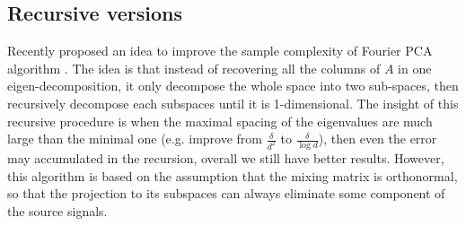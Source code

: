 
\subsection{Recursive versions}

Recently \citet{vempala2014max} proposed an idea to improve the sample complexity of Fourier PCA algorithm \citep{goyal2014fourier}. 
The idea is that instead of recovering all the columns of $A$ in one eigen-decomposition, it only decompose the whole space into two sub-spaces, 
then recursively decompose each subspaces until it is 1-dimensional.
The insight of this recursive procedure is when the maximal spacing of the eigenvalues are much large than  the minimal one (e.g. improve from $\frac{\delta}{d^2}$ to $\frac{\delta}{\log d}$), then even the error may accumulated in the recursion, overall we still have better results. 
However, this algorithm is based on the assumption that the mixing matrix is orthonormal, so that the projection to its subspaces can always eliminate some component of the source signals. 

